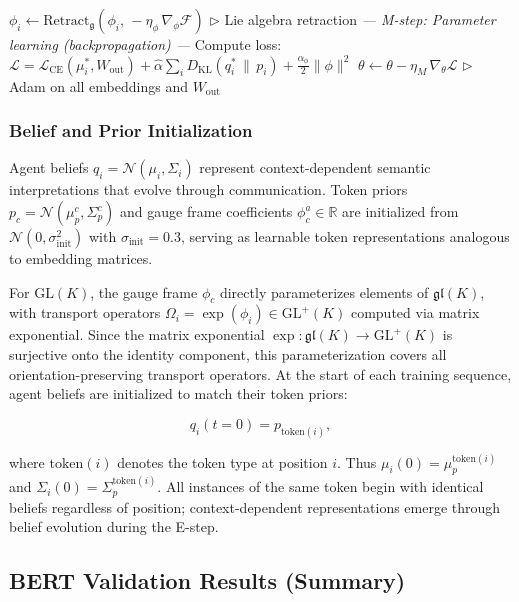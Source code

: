 \documentclass[twoside,11pt]{article}
\newcommand{\KL}{\operatorname{KL}}
\begin{document}
\begin{algorithm}[t]
\begin{algorithmic}[1]
    \STATE $\phi_i \leftarrow \mathrm{Retract}_{\mathfrak{g}}(\phi_i,\, -\eta_\phi\, \nabla_\phi \mathcal{F})$ \hfill $\triangleright$ Lie algebra retraction
\ENDFOR
\STATE
\STATE \textit{--- M-step: Parameter learning (backpropagation) ---}
\STATE Compute loss: $\mathcal{L} = \mathcal{L}_{\text{CE}}(\mu_i^*, W_{\text{out}}) + \hat\alpha\sum_i D_{\KL}(q_i^* \,\|\, p_i) + \frac{\alpha_\phi}{2}\|\phi\|^2$
\STATE $\theta \leftarrow \theta - \eta_M\, \nabla_\theta \mathcal{L}$ \hfill $\triangleright$ Adam on all embeddings and $W_{\text{out}}$
\end{algorithmic}
\end{algorithm}

\subsubsection{Belief and Prior Initialization}

Agent beliefs $q_i = \mathcal{N}(\mu_i, \Sigma_i)$ represent context-dependent semantic interpretations that evolve through communication. Token priors $p_c = \mathcal{N}(\mu_p^c, \Sigma_p^c)$ and gauge frame coefficients $\phi_c^a \in \mathbb{R}$ are initialized from $\mathcal{N}(0, \sigma_{\text{init}}^2)$ with $\sigma_{\text{init}} = 0.3$, serving as learnable token representations analogous to embedding matrices.

For $\mathrm{GL}(K)$, the gauge frame $\phi_c$ directly parameterizes elements of $\mathfrak{gl}(K)$, with transport operators $\Omega_i = \exp(\phi_i) \in \mathrm{GL}^+(K)$ computed via matrix exponential. Since the matrix exponential $\exp: \mathfrak{gl}(K) \to \mathrm{GL}^+(K)$ is surjective onto the identity component, this parameterization covers all orientation-preserving transport operators. At the start of each training sequence, agent beliefs are initialized to match their token priors:

\begin{equation}
q_i(t=0) = p_{\text{token}(i)},
\end{equation}

where $\text{token}(i)$ denotes the token type at position $i$. Thus $\mu_i(0) = \mu_p^{\text{token}(i)}$ and $\Sigma_i(0) = \Sigma_p^{\text{token}(i)}$. All instances of the same token begin with identical beliefs regardless of position; context-dependent representations emerge through belief evolution during the E-step.

\subsection{BERT Validation Results (Summary)}
\end{document}
